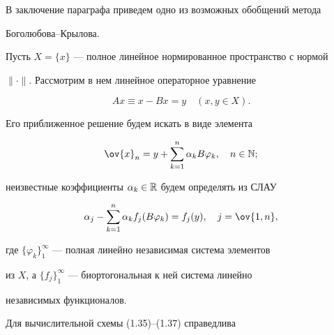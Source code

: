 В заключение параграфа приведем одно из возможных обобщений метода


Боголюбова--Крылова.





Пусть $X=\{ x\}$ --- полное линейное нормированное пространство с нормой


$\|\cdot\|$. Рассмотрим в нем линейное операторное уравнение


\begin{equation}


Ax\equiv x-Bx=y\quad (x,y\in X).


\end{equation}


Его приближенное решение будем искать в виде элемента


\begin{equation}


\ov{x}_n=y+\sum_{k=1}^n\alpha_kB\varphi_k,\quad n\in \bl{N};


\end{equation}


неизвестные коэффициенты $\alpha_k\in \Bbb {R}$ будем определять из СЛАУ


\begin{equation}


\alpha_j-\sum_{k=1}^n\alpha_kf_j(B\varphi_k)=f_j(y),\quad j=\ov{1,n},


\end{equation}


где $\{\varphi_k\}_1^\infty$ --- полная линейно независимая система элементов


из $X$, а $\{f_j\}_1^\infty$ --- биортогональная к ней система линейно


независимых функционалов.





Для вычислительной схемы (1.35)--(1.37) справедлива





